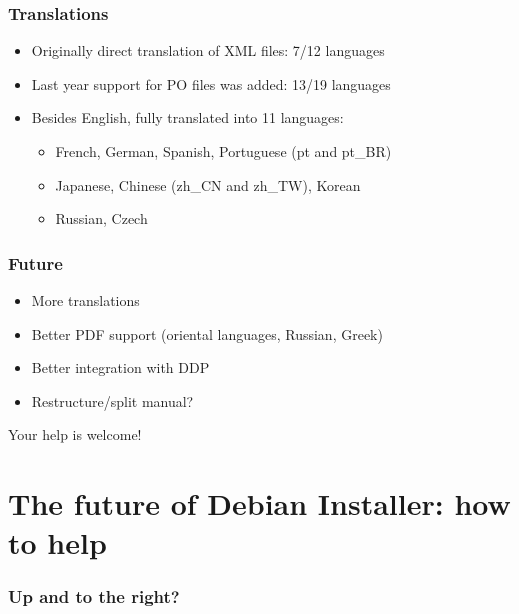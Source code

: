 \documentclass{beamer}
\begin{document}
\begin{frame}
  \frametitle{Translations}
	\begin{itemize}
	\item<1->
		Originally direct translation of XML files: 7/12 languages
	\item<2->
		Last year support for PO files was added: 13/19 languages
	\item<3->
		Besides English, fully translated into 11 languages:
		\begin{itemize}
		\item<3->
			French, German, Spanish, Portuguese (pt and pt\_BR)
		\item<3->
			Japanese, Chinese (zh\_CN and zh\_TW), Korean
		\item<3->
			Russian, Czech
		\end{itemize}
	\end{itemize}
\end{frame}

\begin{frame}
  \frametitle{Future}
	\begin{itemize}[<+->]
	\item
		More translations
	\item
		Better PDF support (oriental languages, Russian, Greek)
	\item
		Better integration with DDP
	\item
		Restructure/split manual?
	\end{itemize}
    \vspace{1cm}
	
	\huge{Your help is welcome!}
\end{frame}


\section{The future of Debian Installer: how to help}

\begin{frame}
  \frametitle{Up and to the right?}
\end{frame}
\end{document}
